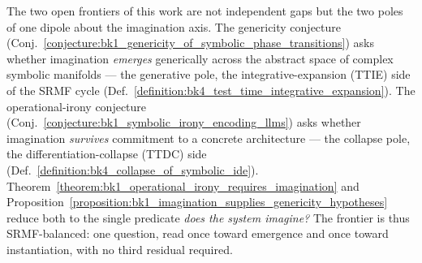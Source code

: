 \begin{scholium}
\label{scholium:bk1_the_imagination_dipole}
The two open frontiers of this work are not independent gaps but the two poles of
one dipole about the imagination axis. The genericity conjecture
(Conj.~\ref{conjecture:bk1_genericity_of_symbolic_phase_transitions}) asks whether
imagination \emph{emerges} generically across the abstract space of complex
symbolic manifolds --- the generative pole, the integrative-expansion (TTIE) side
of the SRMF cycle (Def.~\ref{definition:bk4_test_time_integrative_expansion}). The
operational-irony conjecture
(Conj.~\ref{conjecture:bk1_symbolic_irony_encoding_llms}) asks whether imagination
\emph{survives} commitment to a concrete architecture --- the collapse pole, the
differentiation-collapse (TTDC) side (Def.~\ref{definition:bk4_collapse_of_symbolic_ide}).
Theorem~\ref{theorem:bk1_operational_irony_requires_imagination} and
Proposition~\ref{proposition:bk1_imagination_supplies_genericity_hypotheses} reduce
both to the single predicate \emph{does the system imagine?} The frontier is thus
SRMF-balanced: one question, read once toward emergence and once toward
instantiation, with no third residual required.
\end{scholium}

